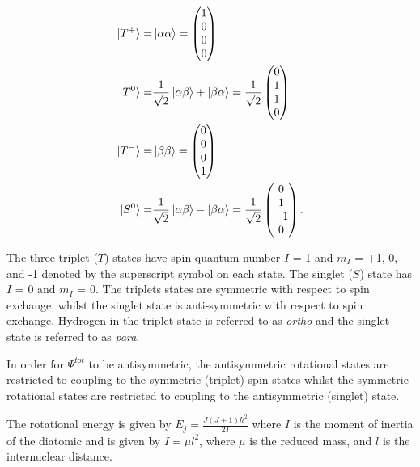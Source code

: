  \begin{align}\label{eqn:H2states}
 \ket{T^+} =& \ket{\alpha\alpha} = \begin{pmatrix}
   1\\
   0\\
   0\\
   0
 \end{pmatrix}\\
 \ket{T^0} =& \frac{1}{\sqrt{2}}\ket{\alpha\beta}+\ket{\beta\alpha} = \frac{1}{\sqrt{2}}\begin{pmatrix}
   0\\
   1\\
   1\\
   0
 \end{pmatrix} \\
 \ket{T^-} =& \ket{\beta\beta} = \begin{pmatrix}
   0\\
   0\\
   0\\
   1
 \end{pmatrix}\\
 \ket{S^0} =& \frac{1}{\sqrt{2}}\ket{\alpha\beta}-\ket{\beta\alpha} = \frac{1}{\sqrt{2}}\begin{pmatrix}
   0\\
   1\\
   -1\\
   0
 \end{pmatrix}.
 \end{align}

 The three triplet ($T$) states have spin quantum number $I$ = 1 and $m_I$ = +1, 0, and -1 denoted by the superscript symbol on each state.
 The singlet ($S$) state has $I$ = 0 and $m_I$ = 0. The triplets states are symmetric with respect to spin exchange, whilst the
 singlet state is anti-symmetric with respect to spin exchange. Hydrogen in the triplet state is referred to as \textit{ortho} and the
 singlet state is referred to as \textit{para}.

 In order for $\Psi^{tot}$ to be antisymmetric, the antisymmetric rotational states are restricted to coupling to the symmetric
 (triplet) spin states whilst the symmetric rotational states are restricted to coupling to the antisymmetric (singlet) state.

 The rotational energy is given by $E_j = \frac{J(J+1)\hbar^2}{2I}$
 where $I$ is the moment of inertia of the diatomic and is given by $I = \mu l^2$, where $\mu$ is the reduced mass,
 and $l$ is the internuclear distance.

